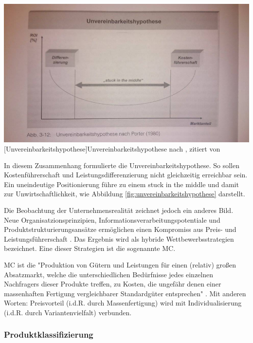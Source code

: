 \documentclass[12pt,a4paper,bibliography=totocnumbered,listof=totoc]{scrartcl}
\begin{document}
\vspace{1em}
\begin{minipage}{\linewidth}
	\centering
	\includegraphics[width=0.7\linewidth]{Abbildungen/unvereinbarkeitshypothese.jpg}
	[Unvereinbarkeitshypothese]{Unvereinbarkeitshypothese nach \cite{porter80}, zitiert von \cite{schuh05}}
	\label{fig:unvereinbarkeitshypothese}
\end{minipage}
\vspace{1em}

In diesem Zusammenhang formulierte \citeauthor{porter80} die Unvereinbarkeitshypothese. So sollen Kostenführerschaft und Leistungsdifferenzierung nicht gleichzeitig erreichbar sein. Ein uneindeutige Positionierung führe zu einem \glqq stuck in the middle\grqq{} und damit zur Unwirtschaftlichkeit, wie Abbildung \ref{fig:unvereinbarkeitshypothese} darstellt.

Die Beobachtung der Unternehmensrealität zeichnet jedoch ein anderes Bild. Neue Organisatzionsprinzipien, Informationsverarbeitungspotentiale und Produktstrukturierungsansätze ermöglichen einen Kompromiss aus Preis- und Leistungsführerschaft \citep{schuh05}. Das Ergebnis wird als hybride Wettbewerbsstrategien bezeichnet. Eine dieser Strategien ist die sogenannte \ac{MC}.

\ac{MC} ist die "Produktion von Gütern und Leistungen für einen (relativ) großen Absatzmarkt, welche die unterschiedlichen Bedürfnisse jedes einzelnen Nachfragers dieser Produkte treffen, zu Kosten, die ungefähr denen einer massenhaften Fertigung vergleichbarer Standardgüter entsprechen"  \citep{piller98}. Mit anderen Worten: Preisvorteil (i.d.R. durch Massenfertigung) wird mit Individualisierung (i.d.R. durch Variantenvielfalt) verbunden.

\subsubsection{Produktklassifizierung}
 \label{subssubsection:Produktklassifizierung}
\end{document}
